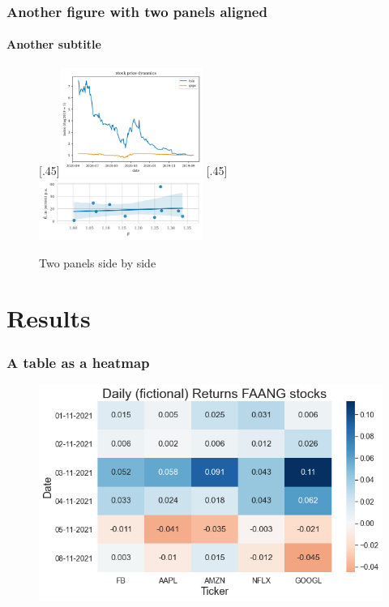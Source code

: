 \documentclass{beamer}
\begin{document}
\begin{frame}
    \frametitle{Another figure with two panels aligned}
    \framesubtitle{Another subtitle}
    \begin{figure}[H]
        \centering
          [.45\linewidth]{\includegraphics[height=3.5cm]{stock-index-weird-plot.png}}
          [.45\linewidth]{\includegraphics[height=2cm]{beta-vs-mu.png}}
    \caption{Two panels side by side}    
    \end{figure}        
\end{frame}

\section{Results}
\begin{frame}
    \frametitle{A table as a heatmap}
    \begin{figure}[H]
      \centering
      \includegraphics[width=\linewidth]{heatmap.png}
    \end{figure}        
\end{frame}
\end{document}

